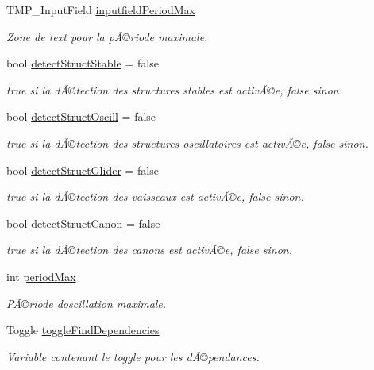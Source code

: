 \begin{DoxyCompactItemize}
T\+M\+P\+\_\+\+Input\+Field \mbox{\hyperlink{class_parameters_a9e5e6a9e22f6324e6373feba6b311808}{inputfield\+Period\+Max}}
\begin{DoxyCompactList}\small\item\em Zone de text pour la pÃ©riode maximale. \end{DoxyCompactList}\item 
bool \mbox{\hyperlink{class_parameters_a9cee3a4a38b1085ad46833289acf1336}{detect\+Struct\+Stable}} = false
\begin{DoxyCompactList}\small\item\em true si la dÃ©tection des structures stables est activÃ©e, false sinon. \end{DoxyCompactList}\item 
bool \mbox{\hyperlink{class_parameters_a861434feae8c97b839615973c0e0e2ec}{detect\+Struct\+Oscill}} = false
\begin{DoxyCompactList}\small\item\em true si la dÃ©tection des structures oscillatoires est activÃ©e, false sinon. \end{DoxyCompactList}\item 
bool \mbox{\hyperlink{class_parameters_a4785fe04733d4ef9e76e314ca2fc120c}{detect\+Struct\+Glider}} = false
\begin{DoxyCompactList}\small\item\em true si la dÃ©tection des vaisseaux est activÃ©e, false sinon. \end{DoxyCompactList}\item 
bool \mbox{\hyperlink{class_parameters_a87a3d90929121cd0f27d1aeb55551dcc}{detect\+Struct\+Canon}} = false
\begin{DoxyCompactList}\small\item\em true si la dÃ©tection des canons est activÃ©e, false sinon. \end{DoxyCompactList}\item 
int \mbox{\hyperlink{class_parameters_a5f6937553d6c12a654fb93e1b6838d53}{period\+Max}}
\begin{DoxyCompactList}\small\item\em PÃ©riode d\textquotesingle{}oscillation maximale. \end{DoxyCompactList}\item 
Toggle \mbox{\hyperlink{class_parameters_a90f764b548eabcd6bb826cfb8ccd750f}{toggle\+Find\+Dependencies}}
\begin{DoxyCompactList}\small\item\em Variable contenant le toggle pour les dÃ©pendances. \end{DoxyCompactList}\item 

\end{DoxyCompactItemize}
